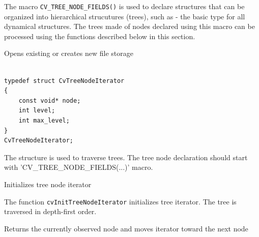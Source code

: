 The macro \texttt{CV\_TREE\_NODE\_FIELDS()} is used to declare structures
that can be organized into hierarchical strucutures (trees), such as
 - the basic type for all dynamical structures. The trees
made of nodes declared using this macro can be processed using the
functions described below in this section.

\label{CvTreeNodeIterator}

Opens existing or creates new file storage

\begin{lstlisting}

typedef struct CvTreeNodeIterator
{
    const void* node;
    int level;
    int max_level;
}
CvTreeNodeIterator;

\end{lstlisting}

The structure  is used to traverse trees. The tree node declaration should start with 'CV\_TREE\_NODE\_FIELDS(...)' macro.

\label{InitTreeNodeIterator}

Initializes tree node iterator


\begin{description}
\end{description}

The function \texttt{cvInitTreeNodeIterator} initializes tree iterator. The tree is traversed in depth-first order.

\label{NextTreeNode}

Returns the currently observed node and moves iterator toward the next node

